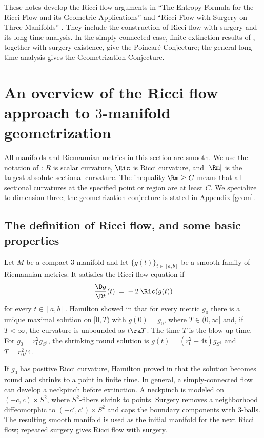 These notes develop the Ricci flow arguments in
``The Entropy Formula for the Ricci Flow and its Geometric
Applications'' \cite{Perelman} and ``Ricci Flow with Surgery
on Three-Manifolds'' \cite{Perelman2}.  They include the construction of
Ricci flow with surgery and its long-time analysis.  In the simply-connected
case, finite extinction results of
\cite{Colding-Minicozzi,Colding-Minicozzi2,Perelman3}, together with surgery
existence, give the Poincar\'e Conjecture; the general long-time analysis gives
the Geometrization Conjecture.

\section{An overview of the Ricci flow approach to
$3$-manifold geometrization}
\label{overview0}

All manifolds and Riemannian metrics in this section are smooth.  We use the
notation of \cite{Perelman,Perelman2}: $R$ is scalar curvature, $\Ric$ is
Ricci curvature, and $|\Rm|$ is the largest absolute sectional curvature.
The inequality $\Rm\geq C$ means that all sectional curvatures at the
specified point or region are at least $C$.  We specialize to dimension three;
the geometrization conjecture is stated in Appendix \ref{geom}.

\subsection{The definition of Ricci flow, and some basic properties}

Let $M$ be a compact $3$-manifold and let $\{g(t)\}_{t\in [a,b]}$ be a
smooth family of Riemannian metrics.  It satisfies the Ricci flow equation if
\begin{equation}
\frac{\D g}{\D t}(t) \: = \:
-\:2\:\Ric(g(t))
\end{equation}
for every $t\in[a,b]$.  Hamilton showed in \cite{Hamiltonnnnn} that for
every metric $g_0$ there is a unique maximal solution on $[0,T)$ with
$g(0)=g_0$, where $T\in(0,\infty]$ and, if $T<\infty$, the curvature is
unbounded as $t\ra T$.  The time $T$ is the blow-up time.  For
$g_0=r_0^2g_{S^3}$, the shrinking round solution is
$g(t)=(r_0^2-4t)g_{S^3}$ and $T=r_0^2/4$.

If $g_0$ has positive Ricci curvature, Hamilton proved in \cite{Hamilton}
that the solution becomes round and shrinks to a point in finite time.  In
general, a simply-connected flow can develop a neckpinch before extinction.
A neckpinch is modeled on $(-c,c)\times S^2$, where $S^2$-fibers shrink to
points.  Surgery removes a neighborhood diffeomorphic to
$(-c',c')\times S^2$ and caps the boundary components with $3$-balls.  The
resulting smooth manifold is used as the initial manifold for the next Ricci
flow; repeated surgery gives Ricci flow with surgery.

